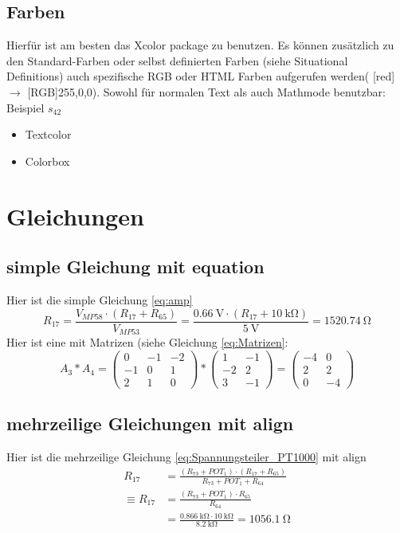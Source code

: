 \documentclass{scrartcl}
\begin{document}
\subsection{Farben}
Hierfür ist am besten das Xcolor package zu benutzen. Es können zusätzlich zu den Standard-Farben oder selbst definierten Farben (siehe Situational Definitions) auch spezifische RGB oder HTML Farben aufgerufen werden( [red] $\to$ [RGB]{255,0,0}). Sowohl für normalen Text als auch Mathmode benutzbar: \textcolor[RGB]{255,0,0}{Beispiel $s_{42}$}
\begin{itemize}
    \item \textcolor[RGB]{100,100,100}{Textcolor}
    \item \colorbox{codegreen}{Colorbox}
\end{itemize}

\section{Gleichungen}
\subsection{simple Gleichung mit equation}
Hier ist die simple Gleichung \ref{eq:amp}
\begin{equation}
\label{eq:amp}
 R_{17}=\frac{V_{MP58}\cdot (R_{17}+R_{65})}{V_{MP53}} = \frac{\SI{0.66}{\volt}\cdot (R_{17}+\SI{10}{\kilo\ohm})}{\SI{5}{\volt}}=\SI{1520.74}{\ohm}
\end{equation}
Hier ist eine mit Matrizen (siehe Gleichung \ref{eq:Matrizen}:
\begin{equation}
\label{eq:Matrizen}
A_3*A_4=
    \left(\begin{array}{ccc}
         0&-1&-2\\
         -1 & 0&1\\
         2 & 1& 0
    \end{array}\right)
    *
    \left(\begin{array}{cc}
         1 & -1\\
         -2 &2\\
         3 & -1
    \end{array}\right)
    =
    \left(\begin{array}{cc}
         -4 & 0\\
         2 & 2\\
         0 & -4
    \end{array}\right)
\end{equation}
\subsection{mehrzeilige Gleichungen mit align}
Hier ist die mehrzeilige Gleichung \ref{eq:Spannungsteiler_PT1000} mit align
\begin{align}
\label{eq:Spannungsteiler_PT1000}
    R_{17}&=\frac{(R_{73}+POT_1)\cdot(R_{17}+R_{65})}{R_{73}+POT_1+R_{64}}\\
    \equiv R_{17}&=\frac{(R_{73}+POT_1)\cdot R_{65}}{R_{64}}\\
    &=\frac{\SI{0.866}{\kilo\ohm}\cdot\SI{10}{\kilo\ohm}}{\SI{8.2}{\kilo\ohm}}=\SI{1056.1}{\ohm}
\end{align}
\end{document}
